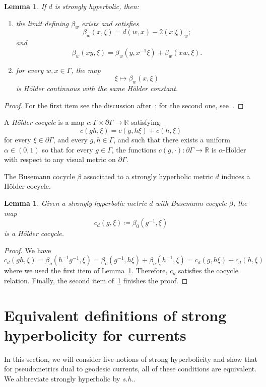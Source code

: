 \documentclass[12pt]{amsart}
\numberwithin{equation}{section}
\numberwithin{figure}{section}
\newtheorem{lemma}[equation]{Lemma}
\theoremstyle{definition}
\theoremstyle{plain}
\begin{document}
\begin{lemma}\label{lem:strong-cocycle-holder}
If $d$ is strongly hyperbolic, then:
\begin{enumerate}
\item the limit defining $\beta_w$ exists and satisfies
\[
\beta_w(x,\xi)=d(w,x)-2(x|\xi)_w;
\]
and
\begin{equation}\label{lem:strong-cocycle-identity}
\beta_w(xy,\xi)
=
\beta_w(y,x^{-1}\xi)+\beta_w(xw,\xi). 
\end{equation}
\label{item:strong-cocycle-identities}
\item for every $w,x\in\Gamma$, the map
\[
\xi\mapsto \beta_w(x,\xi)
\]
is H\"older continuous with the same H\"older constant.
\label{item:strong-cocycle-holder}
\end{enumerate}
\end{lemma}
\begin{proof}
For the first item see the discussion after~\cite[Definition~2.1]{CT24:Invariant}; for the second one, see~\cite[Example~4.12]{CMGR26:GreenMetrics}.
\end{proof}

A \emph{H\"older cocycle} is a map $c \colon \Gamma \times \partial \Gamma \to \mathbb{R}$ satisfying
\[
c(gh,\xi)=c(g,h\xi) + c(h,\xi)
\]
for every $\xi \in \partial\Gamma$, and every $g,h \in \Gamma$, and such that there exists a uniform $\alpha \in (0,1)$ so that for every $g \in \Gamma$, the functions $c(g, \cdot) \colon \partial \Gamma \to \mathbb{R}$ is $\alpha$-H\"older with respect to any visual metric on $\partial \Gamma$.

The Busemann cocycle $\beta$ associated to a strongly hyperbolic metric $d$ induces a H\"older cocycle.
\begin{lemma}
Given a strongly hyperbolic metric $d$ with Busemann cocycle $\beta$, the map
\[
c_d(g,\xi) \coloneqq \beta_0(g^{-1},\xi)
\]
is a H\"older cocycle.
\end{lemma}
\begin{proof}
We have
\[
c_d(g h, \xi) = \beta_o(h^{-1}g^{-1}, \xi) = \beta_o(g^{-1}, h \xi) + \beta_o(h^{-1},\xi) = c_d(g, h \xi) + c_d(h, \xi)
\]
where we used the first item of Lemma~\ref{lem:strong-cocycle-holder}.
Therefore, $c_d$ satisfies the cocycle relation. Finally, the second item of~\ref{lem:strong-cocycle-holder} finishes the proof.
\end{proof}
\section{Equivalent definitions of strong hyperbolicity for currents}
\label{sec:stronghyp}
In this section, we will consider five notions of strong hyperbolicity and show that for pseudometrics dual to geodesic currents, all of these conditions are equivalent. We abbreviate strongly hyperbolic by \emph{s.h.}.
\end{document}
